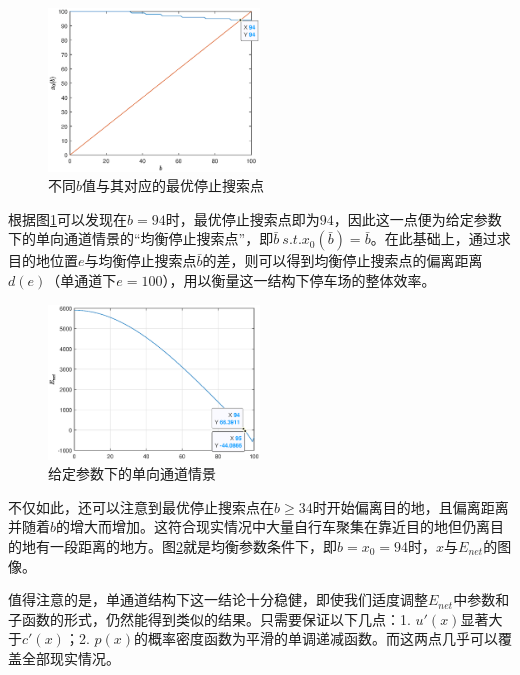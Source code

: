 \documentclass{thuemp}
\begin{document}
\begin{figure}[H]
    \centering
    \includegraphics[width=0.5\textwidth]{single_entrance_b_x.eps}
    \caption{不同$b$值与其对应的最优停止搜索点}
    \label{fig:2}
\end{figure}

\par 根据图\ref{fig:2}可以发现在$b=94$时，最优停止搜索点即为$94$，因此这一点便为给定参数下的单向通道情景的“均衡停止搜索点”，即$\bar{b}~s.t.x_0(\bar{b})=\bar{b}$。在此基础上，通过求目的地位置$e$与均衡停止搜索点$\bar{b}$的差，则可以得到均衡停止搜索点的偏离距离$d(e)$（单通道下$e=100$），用以衡量这一结构下停车场的整体效率。

\begin{figure}[H]
    \centering
    \includegraphics[width=0.5\textwidth]{single_entrance.eps}
    \caption{给定参数下的单向通道情景}
    \label{fig:3}
\end{figure}

\par 不仅如此，还可以注意到最优停止搜索点在$b\geq 34$时开始偏离目的地，且偏离距离并随着$b$的增大而增加。这符合现实情况中大量自行车聚集在靠近目的地但仍离目的地有一段距离的地方。图\ref{fig:3}就是均衡参数条件下，即$b=x_0=94$时，$x$与$E_{net}$的图像。


\par 值得注意的是，单通道结构下这一结论十分稳健，即使我们适度调整$E_{net}$中参数和子函数的形式，仍然能得到类似的结果。只需要保证以下几点：1. $u'(x)$显著大于$c'(x)$；2. $p(x)$的概率密度函数为平滑的单调递减函数。而这两点几乎可以覆盖全部现实情况。
\end{document}
